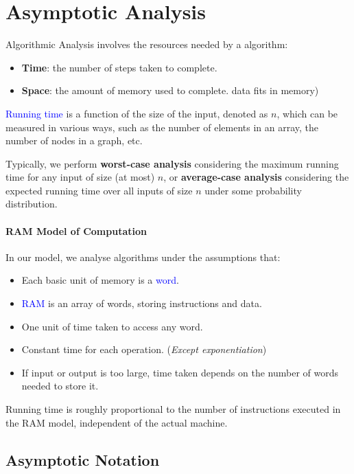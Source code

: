 \section{Asymptotic Analysis}
Algorithmic Analysis involves the \textcolor{Bittersweet}{resources needed} by
a algorithm:
\begin{itemize}
  \item {\textbf{Time}}: the number of steps taken to complete. 
  \item {\textbf{Space}}: the amount of memory used to complete. 
    data fits in memory)
\end{itemize}
\textcolor{Blue}{Running time} is a function of the
\textcolor{Bittersweet}{size of the input}, denoted as $n$, which can be
measured in various ways, such as the number of elements in an array, the
number of nodes in a graph, etc.

Typically, we perform \textbf{worst-case analysis} considering the
\textcolor{Bittersweet}{maximum running time} for any input of size (at most)
$n$, or \textbf{average-case analysis} considering the
\textcolor{Bittersweet}{expected running time} over all inputs of size $n$
under some probability distribution.

\paragraph{RAM Model of Computation}
In our model, we analyse algorithms under the assumptions that:
\begin{itemize}
  \item Each basic unit of memory is a \textcolor{Blue}{word}.
  \item \textcolor{Blue}{RAM} is an array of words, storing instructions and
    data.
  \item One unit of time taken to access any word.
  \item \textcolor{Bittersweet}{Constant time} for each operation. (\emph{Except exponentiation})
  \item If input or output is too large, time taken depends on the number of
    words needed to store it.
\end{itemize}
Running time is \textcolor{Bittersweet}{roughly proportional to the number of
instructions} executed in the RAM model, independent of the actual machine.

\subsection{Asymptotic Notation}
